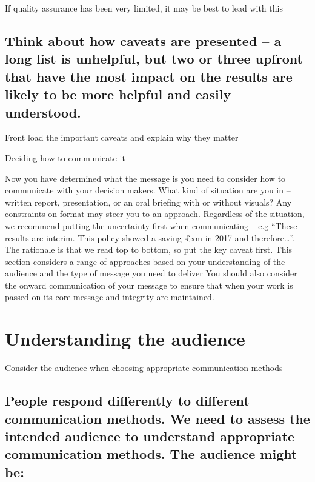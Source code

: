 \documentclass[]{book}
\begin{document}
 If quality assurance has been very limited, it may be best to lead with
this

\subsection{Think about how caveats are presented -- a long list is
unhelpful, but two or three upfront that have the most impact on the
results are likely to be more helpful and easily
understood.}\label{think-about-how-caveats-are-presented-a-long-list-is-unhelpful-but-two-or-three-upfront-that-have-the-most-impact-on-the-results-are-likely-to-be-more-helpful-and-easily-understood.}

 Front load the important caveats and explain why they matter

Deciding how to communicate it

 Now you have determined what the message is you need to consider how to
communicate with your decision makers. What kind of situation are you in
-- written report, presentation, or an oral briefing with or without
visuals? Any constraints on format may steer you to an approach.
Regardless of the situation, we recommend putting the uncertainty first
when communicating -- e.g ``These results are interim. This policy
showed a saving £xm in 2017 and therefore\ldots{}''. The rationale is
that we read top to bottom, so put the key caveat first. This section
considers a range of approaches based on your understanding of the
audience and the type of message you need to deliver You should also
consider the onward communication of your message to ensure that when
your work is passed on its core message and integrity are maintained.

\section{Understanding the audience}\label{understanding-the-audience}

 Consider the audience when choosing appropriate communication methods

\subsection{People respond differently to different communication
methods. We need to assess the intended audience to understand
appropriate communication methods. The audience might
be:}\label{people-respond-differently-to-different-communication-methods.-we-need-to-assess-the-intended-audience-to-understand-appropriate-communication-methods.-the-audience-might-be}
\end{document}
